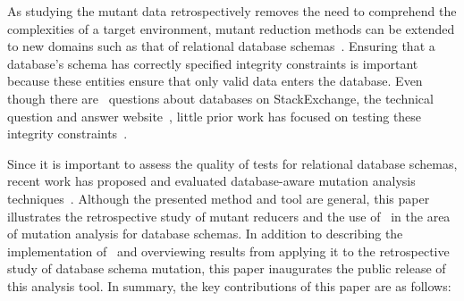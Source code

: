 

As studying the mutant data retrospectively removes the need to comprehend the complexities of a target environment,
mutant reduction methods can be extended to new domains such as that of relational database
schemas~\cite{mcminn2016virtual, mcminn2015effectiveness, wright2013efficient}. Ensuring that a database's schema has
correctly specified integrity constraints is important because these entities ensure that only valid data enters the
database. Even though there are \numquestions~questions about databases on StackExchange, the technical question and
answer website~\cite{stackexchange}, little prior work has focused on testing these integrity
constraints~\cite{mcminn2016virtual}.




Since it is important to assess the quality of tests for relational database schemas, recent work has proposed and
evaluated database-aware mutation analysis techniques~\cite{mcminn2016virtual, mcminn2015effectiveness,
wright2013efficient}. Although the presented method and tool are general, this paper illustrates the retrospective study
of mutant reducers and the use of \mr~in the area of mutation analysis for database schemas. In addition to describing
the implementation of \mr~and overviewing results from applying it to the retrospective study of database schema
mutation, this paper inaugurates the public release of this analysis tool. In summary, the key contributions of this
paper are as follows:

